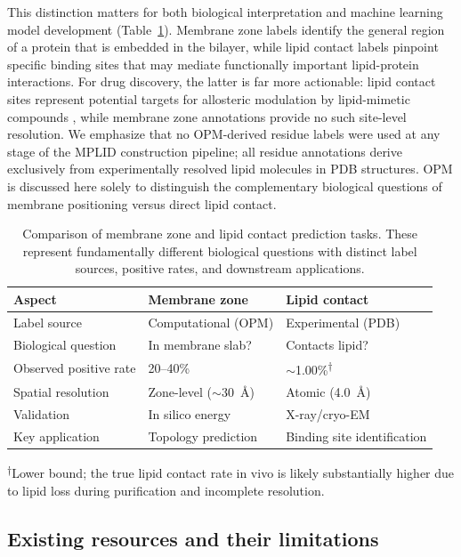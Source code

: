 \documentclass[unnumsec,webpdf,contemporary,large]{oup-authoring-template}
\begin{document}
This distinction matters for both biological interpretation and machine learning model development (Table~\ref{tab:distinction}). Membrane zone labels identify the general region of a protein that is embedded in the bilayer, while lipid contact labels pinpoint specific binding sites that may mediate functionally important lipid-protein interactions. For drug discovery, the latter is far more actionable: lipid contact sites represent potential targets for allosteric modulation by lipid-mimetic compounds \cite{chatzigoulas2022server}, while membrane zone annotations provide no such site-level resolution. We emphasize that no OPM-derived residue labels were used at any stage of the MPLID construction pipeline; all residue annotations derive exclusively from experimentally resolved lipid molecules in PDB structures. OPM is discussed here solely to distinguish the complementary biological questions of membrane positioning versus direct lipid contact.

\begin{table}[tbp]
\centering
\caption{Comparison of membrane zone and lipid contact prediction tasks. These represent fundamentally different biological questions with distinct label sources, positive rates, and downstream applications.}
\label{tab:distinction}
\small
\begin{tabular}{@{}p{2.2cm}p{2.5cm}p{2.5cm}@{}}
\toprule
\textbf{Aspect} & \textbf{Membrane zone} & \textbf{Lipid contact} \\
\midrule
Label source & Computational (OPM) & Experimental (PDB) \\
Biological question & In membrane slab? & Contacts lipid? \\
Observed positive rate & 20--40\% & $\sim$1.00\%\textsuperscript{$\dagger$} \\
Spatial resolution & Zone-level ($\sim$30~\AA) & Atomic (4.0~\AA) \\
Validation & In silico energy & X-ray/cryo-EM \\
Key application & Topology prediction & Binding site identification \\
\bottomrule
\end{tabular}

\vspace{1mm}
\footnotesize{\textsuperscript{$\dagger$}Lower bound; the true lipid contact rate in vivo is likely substantially higher due to lipid loss during purification and incomplete resolution.}
\end{table}

\subsection{Existing resources and their limitations}
\end{document}

